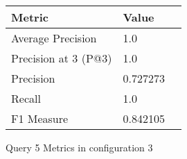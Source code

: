 \begin{figure}[H]
\begin{center}
\begin{tabular}{lll}
\toprule
{}                      Metric &         Value \\
\midrule
     Average Precision &       1.0 \\
  Precision at 3 (P@3) &       1.0 \\
             Precision &  0.727273 \\
                Recall &       1.0 \\
            F1 Measure &  0.842105 \\
\bottomrule
\end{tabular}
\end{center}
\caption{Query 5 Metrics in configuration 3}
\label{fig:query_5_metrics_config_3}
\end{figure}
